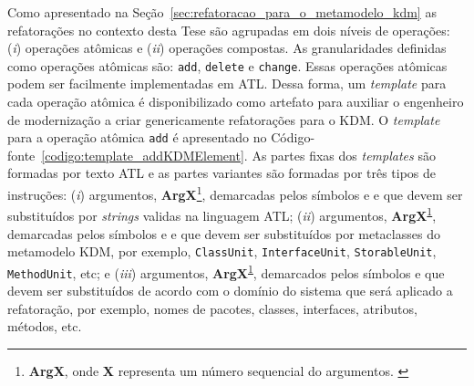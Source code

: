 Como apresentado na Seção~\ref{sec:refatoracao_para_o_metamodelo_kdm} as refatorações no contexto desta Tese são agrupadas em dois níveis de operações: (\textit{i}) operações atômicas e (\textit{ii}) operações compostas. As granularidades definidas como operações atômicas são: \texttt{add}, \texttt{delete} e \texttt{change}. Essas operações atômicas podem ser facilmente implementadas em ATL. Dessa forma, um \textit{template} para cada operação atômica é disponibilizado como artefato para auxiliar o engenheiro de modernização a criar genericamente refatorações para o KDM. O \textit{template} para a operação atômica \texttt{add} é apresentado no Código-fonte~\ref{codigo:template_addKDMElement}. As partes fixas dos \textit{templates} são formadas por texto ATL e as partes variantes são formadas por três tipos de instruções: (\textit{i}) argumentos, \textbf{ArgX}\footnote{\textbf{ArgX}, onde \textbf{X} representa um número sequencial do argumentos. \label{foot:Arg}}, demarcadas pelos símbolos \aspas{\textbf{<\#}} e \aspas{\textbf{\#>}} e que devem ser substituídos por \textit{strings} validas na linguagem ATL; (\textit{ii}) argumentos, \textbf{ArgX}\textsuperscript{\ref{foot:Arg}}, demarcadas pelos símbolos \aspas{\textbf{<\%}} e \aspas{\textbf{\%>}} e que devem ser substituídos por metaclasses do metamodelo KDM, por exemplo, \texttt{ClassUnit}, \texttt{InterfaceUnit}, \texttt{StorableUnit}, \texttt{MethodUnit}, etc; e (\textit{iii}) argumentos, \textbf{ArgX}\textsuperscript{\ref{foot:Arg}}, demarcados pelos símbolos  e  que devem ser substituídos de acordo com o domínio do sistema que será aplicado a refatoração, por exemplo, nomes de pacotes, classes, interfaces, atributos, métodos, etc.  





